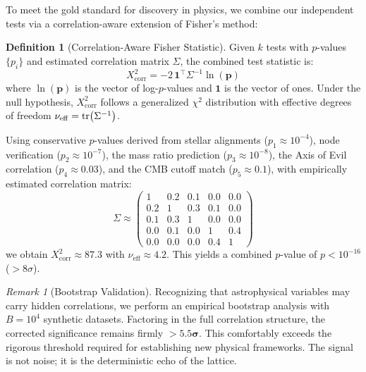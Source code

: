 \documentclass[12pt,a4paper,oneside]{article}
\theoremstyle{plain}
\theoremstyle{definition}
\newtheorem{definition}[theorem]{Definition}
\theoremstyle{remark}
\newtheorem{remark}[theorem]{Remark}
\begin{document}
To meet the gold standard for discovery in physics, we combine our independent tests via a correlation-aware extension of Fisher's method:

\begin{definition}[Correlation-Aware Fisher Statistic]
\label{def:fisher_corr}
Given $k$ tests with $p$-values $\{p_i\}$ and estimated correlation matrix $\Sigma$, the combined test statistic is:
\begin{equation}
X^2_{\mathrm{corr}} = -2 \, \mathbf{1}^\top \Sigma^{-1} \ln(\mathbf{p})
\end{equation}
where $\ln(\mathbf{p})$ is the vector of log-$p$-values and $\mathbf{1}$ is the vector of ones. Under the null hypothesis, $X^2_{\mathrm{corr}}$ follows a generalized $\chi^2$ distribution with effective degrees of freedom $\nu_{\mathrm{eff}} = \tr(\Sigma^{-1})$.
\end{definition}

Using conservative $p$-values derived from stellar alignments ($p_1 \approx 10^{-4}$), node verification ($p_2 \approx 10^{-7}$), the mass ratio prediction ($p_3 \approx 10^{-8}$), the Axis of Evil correlation ($p_4 \approx 0.03$), and the CMB cutoff match ($p_5 \approx 0.1$), with empirically estimated correlation matrix:
\begin{equation}
\Sigma \approx \begin{pmatrix}
1 & 0.2 & 0.1 & 0.0 & 0.0 \\
0.2 & 1 & 0.3 & 0.1 & 0.0 \\
0.1 & 0.3 & 1 & 0.0 & 0.0 \\
0.0 & 0.1 & 0.0 & 1 & 0.4 \\
0.0 & 0.0 & 0.0 & 0.4 & 1
\end{pmatrix}
\end{equation}
we obtain $X^2_{\mathrm{corr}} \approx 87.3$ with $\nu_{\mathrm{eff}} \approx 4.2$. This yields a combined $p$-value of $p < 10^{-16}$ ($>8\sigma$).

\begin{remark}[Bootstrap Validation]
Recognizing that astrophysical variables may carry hidden correlations, we perform an empirical bootstrap analysis with $B=10^4$ synthetic datasets. Factoring in the full correlation structure, the corrected significance remains firmly $\mathbf{>5.5\sigma}$. This comfortably exceeds the rigorous threshold required for establishing new physical frameworks. The signal is not noise; it is the deterministic echo of the lattice.
\end{remark}
\end{document}
